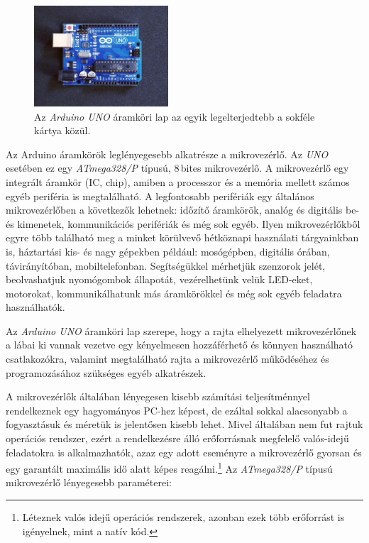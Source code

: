 \documentclass{thesis-ekf}
\theoremstyle{definition}
\begin{document}
\begin{figure}[ht!]
	\centering
	\includegraphics[width=5cm]{arduinoUno.jpg}
	\caption{Az \emph{Arduino UNO} áramköri lap az egyik legelterjedtebb a sokféle kártya közül.}
	\label{fig-arduinoUno}
\end{figure}

Az Arduino áramkörök leglényegesebb alkatrésze a mikrovezérlő. Az \emph{UNO} esetében ez egy \emph{ATmega328/P} típusú, 8\,bites mikrovezérlő. A mikrovezérlő egy integrált áramkör (IC, chip), amiben a processzor és a memória mellett számos egyéb periféria is megtalálható. A legfontosabb perifériák egy általános mikrovezérlőben a következők lehetnek: időzítő áramkörök, analóg és digitális be- és kimenetek, kommunikációs perifériák és még sok egyéb. Ilyen mikrovezérlőkből egyre több található meg a minket körülvevő hétköznapi használati tárgyainkban is, háztartási kis- és nagy gépekben például: mosógépben, digitális órában, távirányítóban, mobiltelefonban. Segítségükkel mérhetjük szenzorok jelét, beolvashatjuk nyomógombok állapotát, vezérelhetünk velük LED-eket, motorokat, kommunikálhatunk más áramkörökkel és még sok egyéb feladatra használhatók.

Az \emph{Arduino UNO} áramköri lap szerepe, hogy a rajta elhelyezett mikrovezérlőnek a lábai ki vannak vezetve egy kényelmesen hozzáférhető és könnyen használható csatlakozókra, valamint megtalálható rajta a mikrovezérlő működéséhez és programozásához szükséges egyéb alkatrészek.

A mikrovezérlők általában lényegesen kisebb számítási teljesítménnyel rendelkeznek egy hagyományos PC-hez képest, de ezáltal sokkal alacsonyabb a fogyasztásuk és méretük is jelentősen kisebb lehet. Mivel általában nem fut rajtuk operációs rendszer, ezért a rendelkezésre álló erőforrásnak megfelelő valós-idejű feladatokra is alkalmazhatók, azaz egy adott eseményre a mikrovezérlő gyorsan és egy garantált maximális idő alatt képes reagálni.\footnote{Léteznek valós idejű operációs rendszerek, azonban ezek több erőforrást is igényelnek, mint a natív kód.}  Az \emph{ATmega328/P} típusú mikrovezérlő lényegesebb paraméterei:
\end{document}
